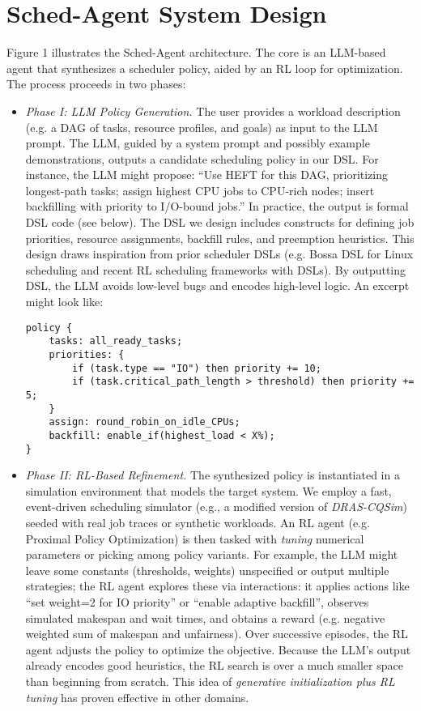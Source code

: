 \section{Sched-Agent System Design}

Figure 1 illustrates the Sched-Agent architecture. The core is an LLM-based agent that synthesizes a scheduler policy, aided by an RL loop for optimization. The process proceeds in two phases:

\begin{itemize}
\item \emph{Phase I: LLM Policy Generation.} The user provides a workload description (e.g. a DAG of tasks, resource profiles, and goals) as input to the LLM prompt. The LLM, guided by a system prompt and possibly example demonstrations, outputs a candidate scheduling policy in our DSL. For instance, the LLM might propose: ``Use HEFT for this DAG, prioritizing longest-path tasks; assign highest CPU jobs to CPU-rich nodes; insert backfilling with priority to I/O-bound jobs.'' In practice, the output is formal DSL code (see below). The DSL we design includes constructs for defining job priorities, resource assignments, backfill rules, and preemption heuristics. This design draws inspiration from prior scheduler DSLs (e.g. Bossa DSL for Linux scheduling and recent RL scheduling frameworks with DSLs). By outputting DSL, the LLM avoids low-level bugs and encodes high-level logic. An excerpt might look like:

\begin{verbatim}
policy {
    tasks: all_ready_tasks;
    priorities: {
        if (task.type == "IO") then priority += 10;
        if (task.critical_path_length > threshold) then priority += 5;
    }
    assign: round_robin_on_idle_CPUs;
    backfill: enable_if(highest_load < X%);
}
\end{verbatim}

\item \emph{Phase II: RL-Based Refinement.} The synthesized policy is instantiated in a simulation environment that models the target system. We employ a fast, event-driven scheduling simulator (e.g., a modified version of \emph{DRAS-CQSim}) seeded with real job traces or synthetic workloads. An RL agent (e.g. Proximal Policy Optimization) is then tasked with \emph{tuning} numerical parameters or picking among policy variants. For example, the LLM might leave some constants (thresholds, weights) unspecified or output multiple strategies; the RL agent explores these via interactions: it applies actions like ``set weight=2 for IO priority'' or ``enable adaptive backfill'', observes simulated makespan and wait times, and obtains a reward (e.g. negative weighted sum of makespan and unfairness). Over successive episodes, the RL agent adjusts the policy to optimize the objective. Because the LLM's output already encodes good heuristics, the RL search is over a much smaller space than beginning from scratch. This idea of \emph{generative initialization plus RL tuning} has proven effective in other domains.
\end{itemize}

